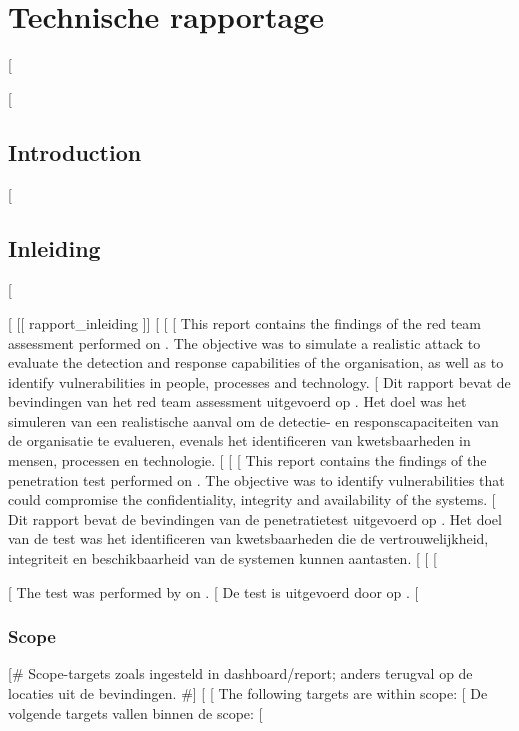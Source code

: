 {{{\section{Technische rapportage}
[%

[%
\subsection{Introduction}
[%
\subsection{Inleiding}
[%

[%
[[ rapport_inleiding ]]
[%
[%
[%
This report contains the findings of the red team assessment performed on \rapportproject.
The objective was to simulate a realistic attack to evaluate the detection and response capabilities
of the organisation, as well as to identify vulnerabilities in people, processes and technology.
[%
Dit rapport bevat de bevindingen van het red team assessment uitgevoerd op \rapportproject.
Het doel was het simuleren van een realistische aanval om de detectie- en responscapaciteiten
van de organisatie te evalueren, evenals het identificeren van kwetsbaarheden in mensen,
processen en technologie.
[%
[%
[%
This report contains the findings of the penetration test performed on \rapportproject.
The objective was to identify vulnerabilities that could compromise the confidentiality,
integrity and availability of the systems.
[%
Dit rapport bevat de bevindingen van de penetratietest uitgevoerd op \rapportproject.
Het doel van de test was het identificeren van kwetsbaarheden die de vertrouwelijkheid,
integriteit en beschikbaarheid van de systemen kunnen aantasten.
[%
[%
[%

[%
The test was performed by \rapportauteur{} on \rapportdatum.
[%
De test is uitgevoerd door \rapportauteur{} op \rapportdatum.
[%

\subsubsection{Scope}

[# Scope-targets zoals ingesteld in dashboard/report; anders terugval op de
   locaties uit de bevindingen. #]
[%
[%
The following targets are within scope:
[%
De volgende targets vallen binnen de scope:
[%

}}}
